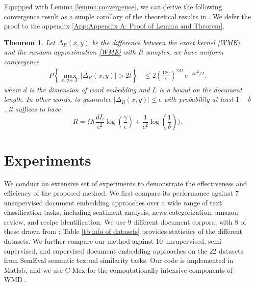 \documentclass[11pt,a4paper]{article}
\newtheorem{theorem}{Theorem}
\newcommand{\X}{\mathcal{X}}
\newcommand{\1}{\boldsymbol{1}}
\begin{document}
Equipped with Lemma \ref{lemma:convergence}, we can derive the following convergence result as a simple corollary of the theoretical results in \cite{wu2018d2ke}. We defer the proof to the appendix \ref{App:Appendix A: Proof of Lemma and Theorem}.

\begin{theorem}\label{thm:convergence}
Let $\Delta_R(x,y)$ be the difference between the exact kernel \eqref{WMK} and the random approximation \eqref{WME} with $R$ samples, we have uniform convergence
\begin{equation*}\label{converge_result}
\begin{aligned}
P\left\{ \max_{x,y\in\X} |\Delta_R(x,y)| > 2t\right\} 
& \leq 2\left(\frac{12\gamma}{t}\right)^{2dL}e^{-Rt^2/2}.
\end{aligned}
\end{equation*}
where $d$ is the dimension of word embedding and $L$ is a bound on the document length. In other words, to guarantee $|\Delta_R(x,y)|\leq \epsilon$ with probability at least $1-\delta$, it suffices to have
$$
R = \Omega\biggl(\frac{dL}{\epsilon^2}\log(\frac{\gamma}{\epsilon})+\frac{1}{\epsilon^2}\log(\frac{1}{\delta}) \biggr).
$$
\end{theorem}


\section{Experiments}
\label{sec:Experiments}
We conduct an extensive set of experiments to demonstrate the effectiveness and efficiency of the proposed method. We first compare its performance against 7 unsupervised document embedding approaches over a wide range of text classification tasks, including sentiment analysis, news categorization, amazon review, and recipe identification. We use 9 different document corpora, with 8 of these drawn from \cite{kusner2015word,huang2016supervised}; Table \ref{tb:info of datasets} provides statistics of the different datasets. We further compare our method against 10 unsupervised, semi-supervised, and supervised document embedding approaches on the 22 datasets from SemEval semantic textual similarity tasks. Our code is implemented in Matlab, and we use C Mex for the computationally intensive components of WMD 
\cite{rubner2000earth}. 
\end{document}
